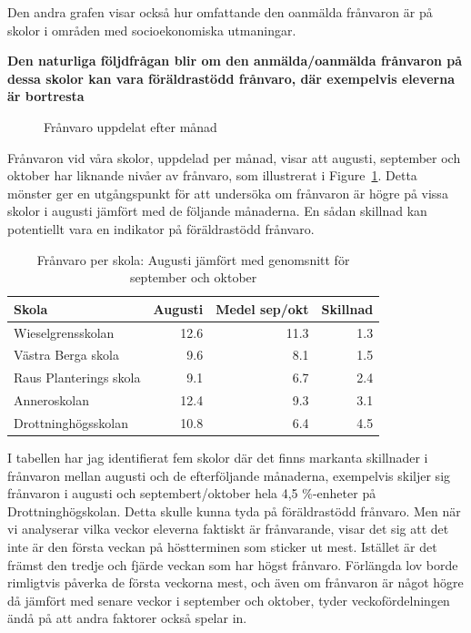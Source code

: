 \documentclass[
  letterpaper,
  DIV=11,
  numbers=noendperiod]{scrartcl}
\begin{document}
Den andra grafen visar också hur omfattande den oanmälda frånvaron är på
skolor i områden med socioekonomiska utmaningar.

\textbf{Den naturliga följdfrågan blir om den anmälda/oanmälda frånvaron
på dessa skolor kan vara föräldrastödd frånvaro, där exempelvis eleverna
är bortresta}

\begin{figure}


\caption{\label{fig-month}Frånvaro uppdelat efter månad}

\end{figure}%

Frånvaron vid våra skolor, uppdelad per månad, visar att augusti,
september och oktober har liknande nivåer av frånvaro, som illustrerat i
Figure~\ref{fig-month}. Detta mönster ger en utgångspunkt för att
undersöka om frånvaron är högre på vissa skolor i augusti jämfört med de
följande månaderna. En sådan skillnad kan potentiellt vara en indikator
på föräldrastödd frånvaro.

\begin{longtable}[t]{lrrr}
\caption{\label{tab:unnamed-chunk-3}Frånvaro per skola: Augusti jämfört med genomsnitt för september och oktober}\\
\toprule
Skola & Augusti & Medel sep/okt & Skillnad\\
\midrule
Wieselgrensskolan & 12.6 & 11.3 & 1.3\\
Västra Berga skola & 9.6 & 8.1 & 1.5\\
Raus Planterings skola & 9.1 & 6.7 & 2.4\\
Anneroskolan & 12.4 & 9.3 & 3.1\\
Drottninghögsskolan & 10.8 & 6.4 & 4.5\\
\bottomrule
\end{longtable}

I tabellen har jag identifierat fem skolor där det finns markanta
skillnader i frånvaron mellan augusti och de efterföljande månaderna,
exempelvis skiljer sig frånvaron i augusti och septembert/oktober hela
4,5 \%-enheter på Drottninghögskolan. Detta skulle kunna tyda på
föräldrastödd frånvaro. Men när vi analyserar vilka veckor eleverna
faktiskt är frånvarande, visar det sig att det inte är den första veckan
på höstterminen som sticker ut mest. Istället är det främst den tredje
och fjärde veckan som har högst frånvaro. Förlängda lov borde rimligtvis
påverka de första veckorna mest, och även om frånvaron är något högre då
jämfört med senare veckor i september och oktober, tyder
veckofördelningen ändå på att andra faktorer också spelar in.
\end{document}
